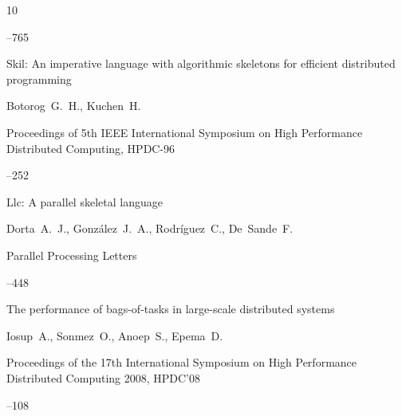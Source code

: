 \begin{thebibliography}{10}

--765









\paper Skil: An imperative language with algorithmic   skeletons for efficient distributed programming

\by Botorog~G.~H., Kuchen~H.

\inbook Proceedings of 5th IEEE International Symposium on High Performance Distributed Computing, \rm HPDC-96


--252






\paper Llc: A parallel skeletal lan\-guage

\by Dorta~A.~J., Gonz\'alez~J.~A., Rodr\'iguez~C., De~Sande~F.

\jour Parallel Processing   Letters




--448





\paper The performance of bags-of-tasks in large-scale distributed systems

\by   Iosup~A., Sonmez~O., Anoep~S., Epema~D.

\inbook Proceedings of the 17th International Symposium on High Performance Distributed Computing 2008, \rm HPDC'08


--108









\end{thebibliography}
